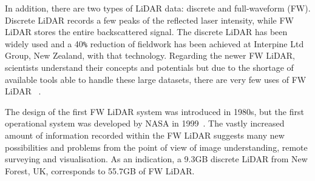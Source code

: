\documentclass{subfiles}
\begin{document}
	\par In addition, there are two types of LiDAR data: discrete and full-waveform (FW). Discrete LiDAR records a few peaks of the reflected laser intensity, while FW LiDAR stores the entire backscattered signal. The discrete LiDAR has been widely used and a 40\verb|%| reduction of fieldwork has been achieved at Interpine Ltd Group, New Zealand, with that technology. Regarding the newer FW LiDAR, scientists understand their concepts and potentials but due to the shortage of available tools able to handle these large datasets, there are very few uses of FW LiDAR ~\cite{Anderson2015}. 
	
	\par  The design of the first FW LiDAR system was introduced in 1980s, but the first operational system was developed by NASA in 1999~\cite{Chauve2007}. The vastly increased amount of information recorded within the FW LiDAR suggests many new possibilities and problems from the point of view of image understanding, remote surveying and visualisation. As an indication, a 9.3GB discrete LiDAR from New Forest, UK, corresponds to 55.7GB of FW LiDAR. 
	

	    
\end{document}
